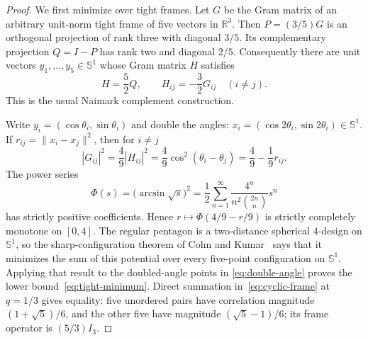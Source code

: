 \documentclass[11pt]{article}
\begin{document}
\begin{proof}
We first minimize over tight frames.  Let $G$ be the Gram matrix of an
arbitrary unit-norm tight frame of five vectors in $\mathbb R^3$.  Then
$P=(3/5)G$ is an orthogonal projection of rank three with diagonal $3/5$.
Its complementary projection $Q=I-P$ has rank two and diagonal $2/5$.
Consequently there are unit vectors $y_1,\dots,y_5\in\mathbb S^1$ whose Gram
matrix $H$ satisfies
\[
 H=\frac52Q,\qquad H_{ij}=-\frac32G_{ij}\quad(i\ne j).
\]
This is the usual Naimark complement construction.

Write $y_i=(\cos\theta_i,\sin\theta_i)$ and double the angles:
$x_i=(\cos2\theta_i,\sin2\theta_i)\in\mathbb S^1$.  If
$r_{ij}=\lVert x_i-x_j\rVert^2$, then for $i\ne j$
\begin{equation}\label{eq:double-angle}
 |G_{ij}|^2=\frac49|H_{ij}|^2
 =\frac49\cos^2(\theta_i-\theta_j)
 =\frac49-\frac19r_{ij}.
\end{equation}
The power series
\begin{equation}\label{eq:phi-series}
 \Phi(s)=\bigl(\arcsin\sqrt s\bigr)^2
 =\frac12\sum_{n=1}^{\infty}
 \frac{4^n}{n^2\binom{2n}{n}}s^n
\end{equation}
has strictly positive coefficients.  Hence
$r\mapsto\Phi(4/9-r/9)$ is strictly completely monotone on $[0,4]$.
The regular pentagon is a two-distance spherical $4$-design on $\mathbb S^1$,
so the sharp-configuration theorem of Cohn and Kumar~\cite{CK} says that it
minimizes the sum of this potential over every five-point configuration on
$\mathbb S^1$.  Applying that result to the doubled-angle points in
\eqref{eq:double-angle} proves the lower bound~\eqref{eq:tight-minimum}.
Direct summation in~\eqref{eq:cyclic-frame} at $q=1/3$ gives equality: five
unordered pairs have correlation magnitude $(1+\sqrt5)/6$, and the other
five have magnitude $(\sqrt5-1)/6$; its frame operator is $(5/3)I_3$.


\end{proof}
\end{document}
